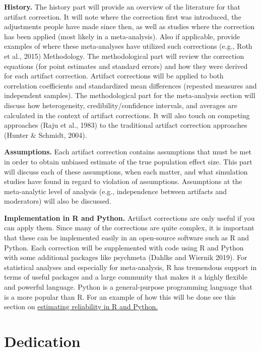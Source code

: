 \documentclass[
  letterpaper,
  DIV=11,
  numbers=noendperiod]{scrreprt}
\begin{document}
\textbf{History.} The history part will provide an overview of the
literature for that artifact correction. It will note where the
correction first was introduced, the adjustments people have made since
then, as well as studies where the correction has been applied (most
likely in a meta-analysis). Also if applicable, provide examples of
where these meta-analyses have utilized such corrections (e.g., Roth et
al., 2015) Methodology. The methodological part will review the
correction equations (for point estimates and standard errors) and how
they were derived for each artifact correction. Artifact corrections
will be applied to both correlation coefficients and standardized mean
differences (repeated measures and independent samples). The
methodological part for the meta-analysis section will discuss how
heterogeneity, credibility/confidence intervals, and averages are
calculated in the context of artifact corrections. It will also touch on
competing approaches (Raju et al., 1983) to the traditional artifact
correction approaches (Hunter \& Schmidt, 2004).

\textbf{Assumptions.} Each artifact correction contains assumptions that
must be met in order to obtain unbiased estimate of the true population
effect size. This part will discuss each of these assumptions, when each
matter, and what simulation studies have found in regard to violation of
assumptions. Assumptions at the meta-analytic level of analysis (e.g.,
independence between artifacts and moderators) will also be discussed.

\textbf{Implementation in R and Python.} Artifact corrections are only
useful if you can apply them. Since many of the corrections are quite
complex, it is important that these can be implemented easily in an
open-source software such as R and Python. Each correction will be
supplemented with code using R and Python with some additional packages
like psychmeta (Dahlke and Wiernik 2019). For statistical analyses and
especially for meta-analysis, R has tremendous support in terms of
useful packages and a large community that makes it a highly flexible
and powerful language. Python is a general-purpose programming language
that is a more popular than R. For an example of how this will be done
see this section on
\protect\hyperlink{estimating-reliability-code}{estimating reliability
in R and Python.}


\hypertarget{dedication}{%
\chapter{Dedication}\label{dedication}}
\end{document}
